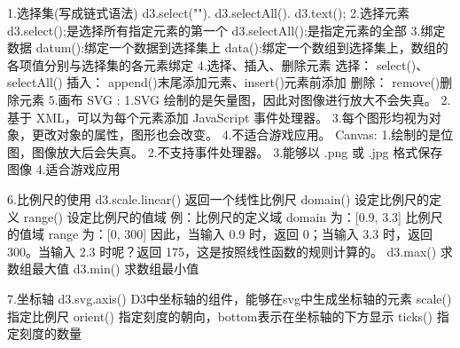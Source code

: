 1.选择集(写成链式语法) 
	d3.select("").
	d3.selectAll().
	d3.text();
2.选择元素
	d3.select();是选择所有指定元素的第一个
	d3.selectAll();是指定元素的全部
3.绑定数据
	datum():绑定一个数据到选择集上
	data():绑定一个数组到选择集上，数组的各项值分别与选择集的各元素绑定
4.选择、插入、删除元素
	选择： select()、selectAll()
	插入： append()末尾添加元素、insert()元素前添加
	删除： remove()删除元素
5.画布
	SVG :
		1.SVG 绘制的是矢量图，因此对图像进行放大不会失真。
		2.基于 XML，可以为每个元素添加 JavaScript 事件处理器。
		3.每个图形均视为对象，更改对象的属性，图形也会改变。
		4.不适合游戏应用。
	Canvas:
		1.绘制的是位图，图像放大后会失真。
		2.不支持事件处理器。
		3.能够以 .png 或 .jpg 格式保存图像
		4.适合游戏应用

6.比例尺的使用
	d3.scale.linear()	返回一个线性比例尺
	domain()	设定比例尺的定义
	range()	设定比例尺的值域
		例：比例尺的定义域 domain 为：[0.9, 3.3]
			比例尺的值域 range 为：[0, 300]
			因此，当输入 0.9 时，返回 0；当输入 3.3 时，返回 300。当输入 2.3 时呢？返回 175，这是按照线性函数的规则计算的。
	d3.max()	求数组最大值
	d3.min()	求数组最小值

7.坐标轴
	d3.svg.axis() D3中坐标轴的组件，能够在svg中生成坐标轴的元素
	scale() 	指定比例尺
	orient() 	指定刻度的朝向，bottom表示在坐标轴的下方显示
	ticks()		指定刻度的数量

	

